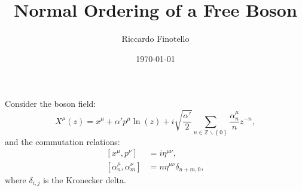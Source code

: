 \documentclass[10pt,a4paper]{article}
\author{Riccardo Finotello}
\title{Normal Ordering of a Free Boson}
\date{\today}
\begin{document}

    \maketitle

    Consider the boson field:
    \begin{equation*}
        X^{\mu}\left( z \right) = x^{\mu} + \alpha' p^{\mu} \ln\left( z \right)
        + i \sqrt{\frac{\alpha'}{2}} \sum\limits_{n \in \mathbb{Z}\backslash
        \left\lbrace 0 \right\rbrace} \frac{\alpha_n^{\mu}}{n} z^{-n},
    \end{equation*}
    and the commutation relations:
    \begin{align*}
        \left[ x^{\mu}, p^{\nu} \right] &= i \eta^{\mu \nu},
        \\
        \left[ \alpha_n^{\mu}, \alpha_m^{\nu} \right] &= n \eta^{\mu \nu}
        \delta_{n+m,0},
    \end{align*}
    where $\delta_{i,j}$ is the Kronecker delta.
\end{document}
